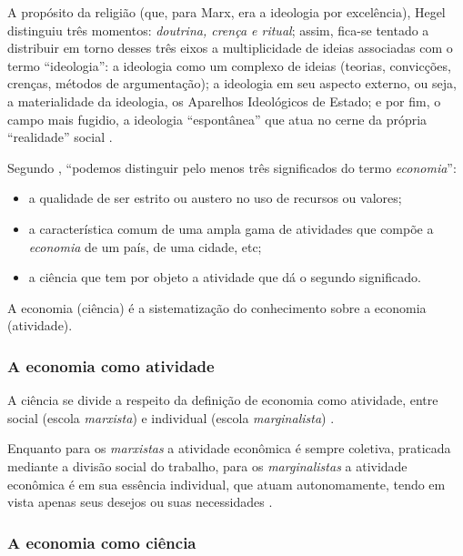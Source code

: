 \documentclass[
	10pt,				%
	openright,			%
	twoside,			%
	a5paper,			%
	english,			%
	french,				%
	spanish,			%
	brazil				%
	]{abntex2}
\renewenvironment{quote}
  {\small\list{}{\rightmargin=0.1cm \leftmargin=4cm}%
   \item\relax}
  {\endlist}
\begin{document}
\begin{quote}
A propósito da religião (que, para Marx, era a ideologia por
excelência), Hegel distinguiu três momentos: \emph{doutrina, crença e
ritual}; assim, fica-se tentado a distribuir em torno desses três eixos
a multiplicidade de ideias associadas com o termo ``ideologia'': a
ideologia como um complexo de ideias (teorias, convicções, crenças,
métodos de argumentação); a ideologia em seu aspecto externo, ou seja, a
materialidade da ideologia, os Aparelhos Ideológicos de Estado; e por
fim, o campo mais fugidio, a ideologia ``espontânea'' que atua no cerne
da própria ``realidade'' social \cite[p.~15]{zizek1996}.
\end{quote}

Segundo , ``podemos distinguir pelo menos três
significados do termo \emph{economia}'':

\begin{itemize}
\tightlist
\item
  a qualidade de ser estrito ou austero no uso de recursos ou valores;
\item
  a característica comum de uma ampla gama de atividades que compõe a
  \emph{economia} de um país, de uma cidade, etc;
\item
  a ciência que tem por objeto a atividade que dá o segundo significado.
\end{itemize}

A economia (ciência) é a sistematização do conhecimento sobre a economia
(atividade).

\subsubsection{A economia como
atividade}\label{a-economia-como-atividade}

A ciência se divide a respeito da definição de economia como atividade,
entre social (escola \emph{marxista}) e individual (escola
\emph{marginalista}) \cite[p.~9]{singer}.

Enquanto para os \emph{marxistas} a atividade econômica é sempre
coletiva, praticada mediante a divisão social do trabalho, para os
\emph{marginalistas} a atividade econômica é em sua essência individual,
que atuam autonomamente, tendo em vista apenas seus desejos ou suas
necessidades \cite[p.~10]{singer}.

\subsubsection{A economia como
ciência}\label{a-economia-como-ciuxeancia}
\end{document}
